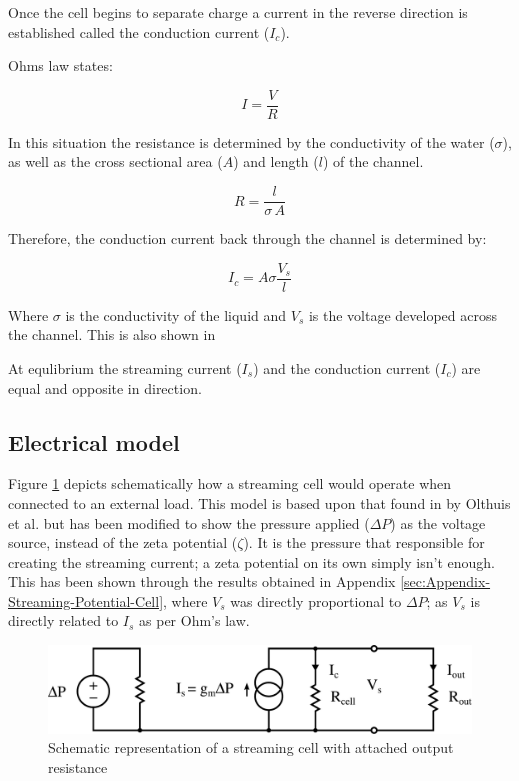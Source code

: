 Once the cell begins to separate charge a current in the reverse direction is
established called the conduction current ($I_{c}$).

Ohms law states:

\[ I=\frac{V}{R} \]


In this situation the resistance is determined by the conductivity of the water
($\sigma$), as well as the cross sectional area ($A$) and length ($l$) of the
channel.

\[ R=\frac{l}{\sigma\, A} \]


Therefore, the conduction current back through the channel is determined by:

\begin{equation} I_{c}=A\sigma\frac{V_{s}}{l} \end{equation}


Where $\sigma$ is the conductivity of the liquid and $V_{s}$ is the voltage
developed across the channel. This is also shown in

At equlibrium the streaming current ($I_{s}$) and the conduction current
($I_{c}$) are equal and opposite in direction.


\subsection{\label{sub:Electrical-model}Electrical model}

Figure \ref{fig:StreamingCell_Schematic-representation} depicts schematically
how a streaming cell would operate when connected to an external load.  This
model is based upon that found in \cite{Olthuis2005} by Olthuis et al. but has
been modified to show the pressure applied ($\Delta P$) as the voltage source,
instead of the zeta potential ($\zeta$). It is the pressure that responsible
for creating the streaming current; a zeta potential on its own simply isn't
enough. This has been shown through the results obtained in Appendix
\ref{sec:Appendix-Streaming-Potential-Cell}, where $V_{s}$ was directly
proportional to $\Delta P$; as $V_{s}$ is directly related to $I_{s}$ as per
Ohm's law.

\begin{figure} \begin{centering}
        \includegraphics[scale=0.55]{content/pt1/01-PowerHarvesting/graphics/StreamingCell_EquivalentCircuit_output}
        \par\end{centering}

\protect\caption{\label{fig:StreamingCell_Schematic-representation}Schematic
    representation of a streaming cell with attached output resistance}
\end{figure}



